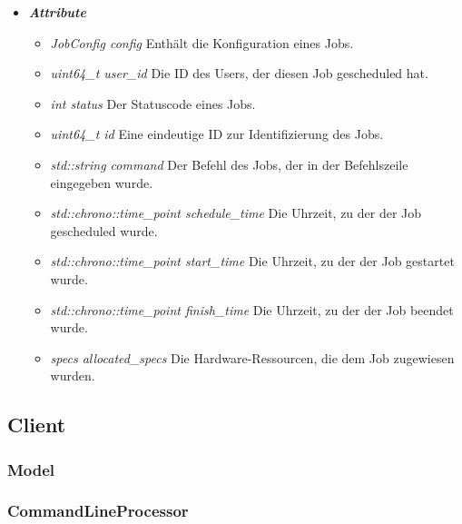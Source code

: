 \documentclass[a4paper,12pt]{article}
\begin{document}
\begin{itemize}[label={}]

	\item \textit{\textbf{Attribute}}
		\begin{itemize}[label={\textbullet}]
			\item \textit{JobConfig config} Enthält die Konfiguration eines Jobs.
			
			\item \textit{uint64\_t user\_id} Die ID des Users, der diesen Job gescheduled hat.
			
			\item \textit{int status} Der Statuscode eines Jobs.
			
			\item \textit{uint64\_t id} Eine eindeutige ID zur Identifizierung des Jobs.
			
			\item \textit{std::string command} Der Befehl des Jobs, der in der Befehlszeile eingegeben wurde.
			
			\item \textit{std::chrono::time\_point schedule\_time} Die Uhrzeit, zu der der Job gescheduled wurde.
			
			\item \textit{std::chrono::time\_point start\_time} Die Uhrzeit, zu der der Job gestartet wurde.
			
			\item \textit{std::chrono::time\_point finish\_time} Die Uhrzeit, zu der der Job beendet wurde.
			
			\item \textit{specs allocated\_specs} Die Hardware-Ressourcen, die dem Job zugewiesen wurden.

		\end{itemize}


\end{itemize}
\clearpage

\subsection{Client}

\subsubsection{Model}


\subsubsection{CommandLineProcessor}
\end{document}
